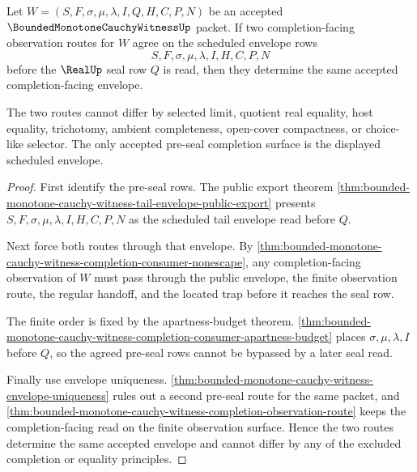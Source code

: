 \begin{theorem}
\label{thm:bounded-monotone-cauchy-witness-completion-envelope-determinacy}
Let $W=(S,F,\sigma,\mu,\lambda,I,Q,H,C,P,N)$ be an accepted $\BoundedMonotoneCauchyWitnessUp$ packet. If two completion-facing observation routes for $W$ agree on the scheduled envelope rows
$$
S,F,\sigma,\mu,\lambda,I,H,C,P,N
$$
before the $\RealUp$ seal row $Q$ is read, then they determine the same accepted completion-facing envelope.

The two routes cannot differ by selected limit, quotient real equality, host equality, trichotomy, ambient completeness, open-cover compactness, or choice-like selector. The only accepted pre-seal completion surface is the displayed scheduled envelope.
\end{theorem}
\begin{proof}
First identify the pre-seal rows. The public export theorem \autoref{thm:bounded-monotone-cauchy-witness-tail-envelope-public-export} presents $S,F,\sigma,\mu,\lambda,I,H,C,P,N$ as the scheduled tail envelope read before $Q$.

Next force both routes through that envelope. By \autoref{thm:bounded-monotone-cauchy-witness-completion-consumer-nonescape}, any completion-facing observation of $W$ must pass through the public envelope, the finite observation route, the regular handoff, and the located trap before it reaches the seal row.

The finite order is fixed by the apartness-budget theorem. \autoref{thm:bounded-monotone-cauchy-witness-completion-consumer-apartness-budget} places $\sigma,\mu,\lambda,I$ before $Q$, so the agreed pre-seal rows cannot be bypassed by a later seal read.

Finally use envelope uniqueness. \autoref{thm:bounded-monotone-cauchy-witness-envelope-uniqueness} rules out a second pre-seal route for the same packet, and \autoref{thm:bounded-monotone-cauchy-witness-completion-observation-route} keeps the completion-facing read on the finite observation surface. Hence the two routes determine the same accepted envelope and cannot differ by any of the excluded completion or equality principles.
\end{proof}

